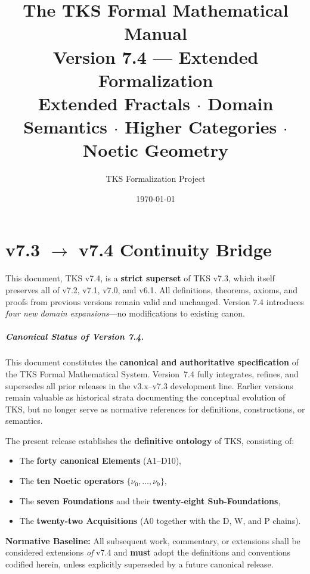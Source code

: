 \documentclass[11pt,twoside,openright]{book}
\title{\Huge\textbf{The TKS Formal Mathematical Manual}\\[0.5em]
       \Large Version 7.4 --- Extended Formalization\\[0.3em]
       \large Extended Fractals $\cdot$ Domain Semantics $\cdot$ Higher Categories $\cdot$ Noetic Geometry}
\author{TKS Formalization Project}
\date{\today}
\theoremstyle{definition}
\theoremstyle{plain}
\theoremstyle{remark}
\begin{document}
\frontmatter
\maketitle


\chapter*{v7.3 $\to$ v7.4 Continuity Bridge}

\begin{tcolorbox}[colback=yellow!10!white,colframe=orange!75!black,title=\textbf{Canonical Inheritance Declaration}]
This document, TKS v7.4, is a \textbf{strict superset} of TKS v7.3, which itself preserves all of v7.2, v7.1, v7.0, and v6.1. All definitions, theorems, axioms, and proofs from previous versions remain valid and unchanged. Version 7.4 introduces \textit{four new domain expansions}---no modifications to existing canon.
\end{tcolorbox}

\begin{tcolorbox}[colback=red!10!white,colframe=red!75!black,title=\textbf{v7.4 Canonical Authority Declaration}]
\paragraph*{Canonical Status of Version 7.4.}
This document constitutes the \textbf{canonical and authoritative specification} of the TKS Formal Mathematical System. Version~7.4 fully integrates, refines, and supersedes all prior releases in the v3.x--v7.3 development line. Earlier versions remain valuable as historical strata documenting the conceptual evolution of TKS, but no longer serve as normative references for definitions, constructions, or semantics.

\medskip
\noindent The present release establishes the \textbf{definitive ontology} of TKS, consisting of:
\begin{itemize}[nosep]
    \item The \textbf{forty canonical Elements} (A1--D10),
    \item The \textbf{ten Noetic operators} $\{\nu_0,\dots,\nu_9\}$,
    \item The \textbf{seven Foundations} and their \textbf{twenty-eight Sub-Foundations},
    \item The \textbf{twenty-two Acquisitions} (A0 together with the D, W, and P chains).
\end{itemize}

\medskip
\noindent\textbf{Normative Baseline:} All subsequent work, commentary, or extensions shall be considered extensions \emph{of} v7.4 and \textbf{must} adopt the definitions and conventions codified herein, unless explicitly superseded by a future canonical release.
\end{tcolorbox}
\end{document}
